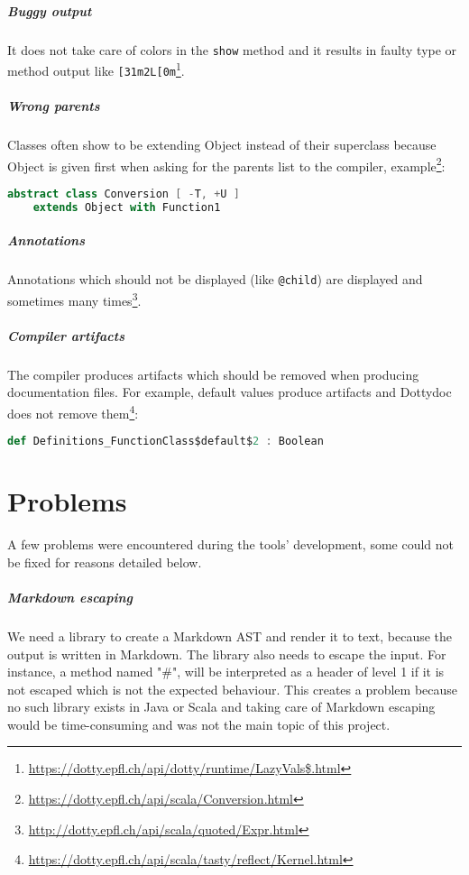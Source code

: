 \documentclass{report}
\begin{document}
\paragraph{Buggy output}
It does not take care of colors in the \texttt{show} method and it results in faulty type or method output like \texttt{[31m2L[0m}\footnote{\url{https://dotty.epfl.ch/api/dotty/runtime/LazyVals$.html}}.

\paragraph{Wrong parents}
Classes often show to be extending Object instead of their superclass because Object is given first when asking for the parents list to the compiler, example\footnote{\url{https://dotty.epfl.ch/api/scala/Conversion.html}}:
\begin{lstlisting}[language=scala]
    abstract class Conversion [ -T, +U ]
    extends Object with Function1
\end{lstlisting}

\paragraph{Annotations}
Annotations which should not be displayed (like \texttt{@child}) are displayed and sometimes many times\footnote{\url{http://dotty.epfl.ch/api/scala/quoted/Expr.html}}.

\paragraph{Compiler artifacts}
The compiler produces artifacts which should be removed when producing documentation files. For example, default values produce artifacts and Dottydoc does not remove them\footnote{\url{https://dotty.epfl.ch/api/scala/tasty/reflect/Kernel.html}}:
\begin{lstlisting}[language=scala]
    def Definitions_FunctionClass$default$2 : Boolean
\end{lstlisting}

\chapter{Problems}
\label{sec:problems}
A few problems were encountered during the tools' development, some could not be fixed for reasons detailed below.

\paragraph{Markdown escaping}
We need a library to create a Markdown AST and render it to text, because the output is written in Markdown. The library also needs to escape the input. For instance, a method named "\#", will be interpreted as a header of level 1 if it is not escaped which is not the expected behaviour. This creates a problem because no such library exists in Java or Scala and taking care of Markdown escaping would be time-consuming and was not the main topic of this project.
\end{document}
